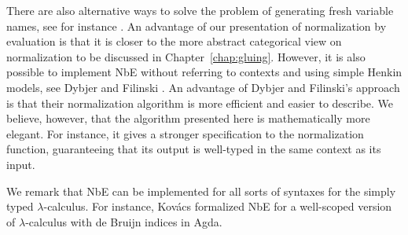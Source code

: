 There are also alternative ways to solve the problem of generating fresh variable names, see for instance \cite{DBLP:conf/lics/BergerS91, dybjer:2002:appsem}. An advantage of our presentation of normalization by evaluation is that it is closer to the more abstract categorical view on normalization to be discussed in Chapter~\ref{chap:gluing}. However, it is also possible to implement NbE without referring to contexts and using simple Henkin models, see Dybjer and Filinski \cite{dybjer:2002:appsem}. An advantage of Dybjer and Filinski's approach is that their normalization algorithm is more efficient and easier to describe. We believe, however, that the algorithm presented here is mathematically more elegant.
For instance, it gives a stronger specification to the normalization function, guaranteeing that its output is well-typed in the same context as its input.

We remark that NbE can be implemented for all sorts of syntaxes for the simply typed $\lambda$-calculus. For instance, Kovács \cite{kovacs:2017:msc} formalized NbE for a well-scoped version of $\lambda$-calculus with de Bruijn indices in Agda.

\begin{comment}
We can extract an NbE program from the Tait proof
Say something about program extraction (not formally)
Explain the computational content of lemmas in Tait proof by explicitly relating them to the NbE algorithm
\end{comment}

\begin{comment}
Since normalization is achieved by using the evaluator of the metalogic to interpret terms in a model, the algorithm is termed "normalization by evaluation". Thus, in effect, the evaluator of the metalogic is what performs the normalization using its computational rules.

Dybjer and Filinksi, page 3 of introduction
Martin-Löf viewed this kind of normalization proof as a kind of normalization
by intuitionistic model construction: he pointed out that equality (convertibility)
in the object-language is modelled by “definitional equality” in the
meta-language \cite{martin-lof:1975:equality}. Thus the method of normalization works because the
simplification according to this definitional equality is carried out by the evaluator
of the intuitionistic (!) meta-language: hence “normalization by evaluation”.
If instead we work in a classical meta-language, then some extra work would be
needed to implement the meta-language function in a programming language.
\end{comment}


